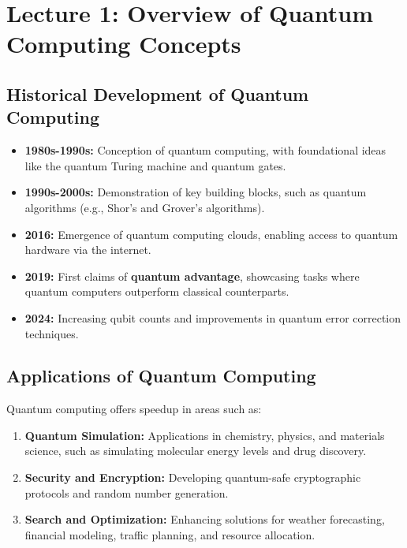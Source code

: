 \section{Lecture 1: Overview of Quantum Computing Concepts}

\subsection*{Historical Development of Quantum Computing}
\begin{itemize}
  \item \textbf{1980s-1990s:} Conception of quantum computing, with
    foundational ideas like the quantum Turing machine and quantum gates.
  \item \textbf{1990s-2000s:} Demonstration of key building blocks, such as
    quantum algorithms (e.g., Shor's and Grover's algorithms).
  \item \textbf{2016:} Emergence of quantum computing clouds, enabling
    access to quantum hardware via the internet.
  \item \textbf{2019:} First claims of \textbf{quantum advantage},
    showcasing tasks where quantum computers outperform classical
    counterparts.
  \item \textbf{2024:} Increasing qubit counts and improvements in quantum
    error correction techniques.
\end{itemize}

\subsection*{Applications of Quantum Computing}
Quantum computing offers speedup in areas such as:
\begin{enumerate}
  \item \textbf{Quantum Simulation:} Applications in chemistry, physics,
    and materials science, such as simulating molecular energy levels and
    drug discovery.
  \item \textbf{Security and Encryption:} Developing quantum-safe
    cryptographic protocols and random number generation.
  \item \textbf{Search and Optimization:} Enhancing solutions for weather
    forecasting, financial modeling, traffic planning, and resource
    allocation.
\end{enumerate}

